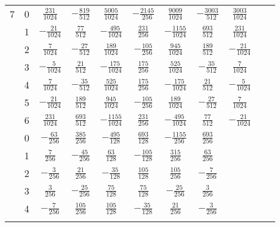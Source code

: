 \begin{table}
\begin{center}
\begin{tabular}{ccccccccccc}
      7  &  0  & $ \frac{231}{1024}$  &  $-\frac{819}{512}$  &  $ \frac{5005}{1024}$  &  $-\frac{2145}{256}$  &  $ \frac{9009}{1024}$  &  $-\frac{3003}{512}$  &  $ \frac{3003}{1024}$  \\ \addlinespace
         &  1  & $-\frac{ 21}{1024}$  &  $ \frac{ 77}{512}$  &  $-\frac{ 495}{1024}$  &  $ \frac{ 231}{256}$  &  $-\frac{1155}{1024}$  &  $ \frac{ 693}{512}$  &  $ \frac{ 231}{1024}$  \\ \addlinespace
         &  2  & $ \frac{  7}{1024}$  &  $-\frac{ 27}{512}$  &  $ \frac{ 189}{1024}$  &  $-\frac{ 105}{256}$  &  $ \frac{ 945}{1024}$  &  $ \frac{ 189}{512}$  &  $-\frac{  21}{1024}$  \\ \addlinespace
         &  3  & $-\frac{  5}{1024}$  &  $ \frac{ 21}{512}$  &  $-\frac{ 175}{1024}$  &  $ \frac{ 175}{256}$  &  $ \frac{ 525}{1024}$  &  $-\frac{  35}{512}$  &  $ \frac{   7}{1024}$  \\ \addlinespace
         &  4  & $ \frac{  7}{1024}$  &  $-\frac{ 35}{512}$  &  $ \frac{ 525}{1024}$  &  $ \frac{ 175}{256}$  &  $-\frac{ 175}{1024}$  &  $ \frac{  21}{512}$  &  $-\frac{   5}{1024}$  \\ \addlinespace
         &  5  & $-\frac{ 21}{1024}$  &  $ \frac{189}{512}$  &  $ \frac{ 945}{1024}$  &  $-\frac{ 105}{256}$  &  $ \frac{ 189}{1024}$  &  $-\frac{  27}{512}$  &  $ \frac{   7}{1024}$  \\ \addlinespace
         &  6  & $ \frac{231}{1024}$  &  $ \frac{693}{512}$  &  $-\frac{1155}{1024}$  &  $ \frac{ 231}{256}$  &  $-\frac{ 495}{1024}$  &  $ \frac{  77}{512}$  &  $-\frac{  21}{1024}$  \\ \addlinespace
      6  &  0  &  $-\frac{63}{256}$  &  $ \frac{385}{256}$  &  $-\frac{495}{128}$  &  $ \frac{693}{128}$  &  $-\frac{1155}{256}$  &  $ \frac{693}{256}$  \\ \addlinespace
         &  1  &  $ \frac{ 7}{256}$  &  $-\frac{ 45}{256}$  &  $ \frac{ 63}{128}$  &  $-\frac{105}{128}$  &  $ \frac{ 315}{256}$  &  $ \frac{ 63}{256}$  \\ \addlinespace
         &  2  &  $-\frac{ 3}{256}$  &  $ \frac{ 21}{256}$  &  $-\frac{ 35}{128}$  &  $ \frac{105}{128}$  &  $ \frac{ 105}{256}$  &  $-\frac{  7}{256}$  \\ \addlinespace
         &  3  &  $ \frac{ 3}{256}$  &  $-\frac{ 25}{256}$  &  $ \frac{ 75}{128}$  &  $ \frac{ 75}{128}$  &  $-\frac{  25}{256}$  &  $ \frac{  3}{256}$  \\ \addlinespace
         &  4  &  $-\frac{ 7}{256}$  &  $ \frac{105}{256}$  &  $ \frac{105}{128}$  &  $-\frac{ 35}{128}$  &  $ \frac{  21}{256}$  &  $-\frac{  3}{256}$  \\ \addlinespace

\end{tabular}
\end{center}
\end{table}
